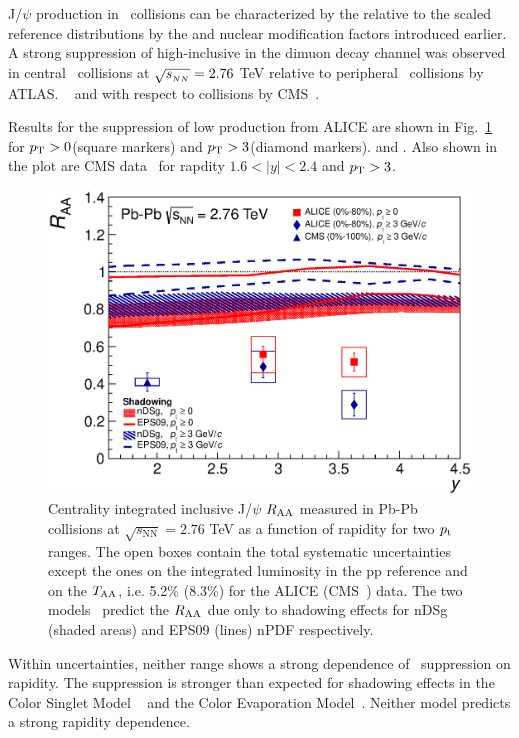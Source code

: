 J/$\psi$ production in \PbPb\ collisions can be characterized by the relative to the \Ncoll scaled reference 
distributions by the \Rcp and \Raa nuclear modification factors introduced earlier.
A strong suppression of high-\pt inclusive \jpsi in the dimuon decay channel was observed in central \PbPb\ collisions
at $\sqrt{s_{_{NN}}} = 2.76$ TeV  relative to peripheral \PbPb\ collisions by ATLAS.
~\cite{Atlas:2010px} and with respect to \pp collisions by CMS~\cite{Chatrchyan:2012np}.

Results for the suppression of low \pt \jpsi production from ALICE are shown 
in Fig.~\ref{fig:GR:raavsy} for $p_{\rm{T}} > 0$\GeVc (square markers) and 
$p_{\rm{T}} > 3$\GeVc (diamond markers). and . Also shown in the plot are CMS data~\cite{Chatrchyan:2012np} 
for rapdity $ 1.6 < |y| < 2.4 $ and $p_{\rm{T}} > 3$\GeVc. 

\begin{figure}
\begin{center}
\includegraphics[width=0.49\linewidth]{qqbarfigures/RAAvsY_v7.eps}
\caption{ \label{fig:GR:raavsy}  Centrality integrated inclusive J/$\psi$ $R_{\rm{AA}}$ measured in Pb-Pb
collisions at $\sqrt{s_{\mathrm{NN}}} = 2.76$ TeV as a function of  rapidity  for two $p_{\rm{t}}$ ranges.
The open boxes contain the total systematic uncertainties except the ones on the integrated luminosity in the pp reference
 and on the $T_{\rm{AA}}$, i.e.  5.2\% (8.3\%) for the  ALICE (CMS~\cite{Chatrchyan:2012np}) data.
The two models~\cite{Ferreiro:2011rw,Vogt:2010aa} predict the  $R_{\rm{AA}}$  due  only to shadowing effects
for  nDSg (shaded areas) and EPS09 (lines) nPDF respectively.}
\end{center}
\end{figure}

Within uncertainties, neither \pt range shows a strong dependence of \jpsi\ suppression on rapidity. 
The suppression is stronger than expected for shadowing effects in the Color Singlet Model
~\cite{Ferreiro:2011rw} and the Color Evaporation Model~\cite{Vogt:2010aa}. Neither model
predicts a strong rapidity dependence.

